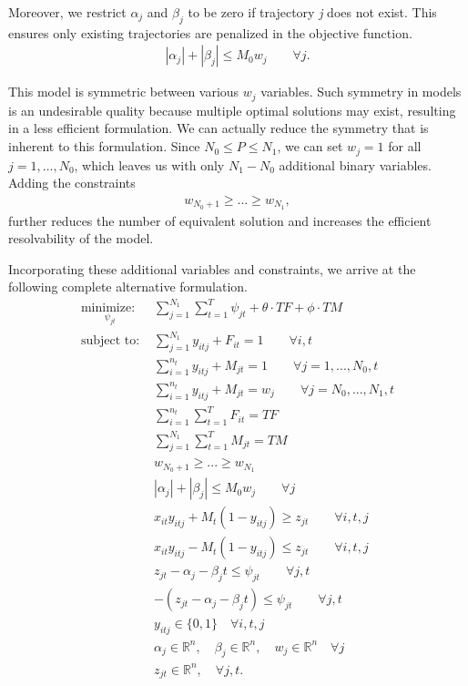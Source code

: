 Moreover, we restrict $\alpha_{j}$ and $\beta_{j}$ to be zero if trajectory \textit{j} does not exist. This ensures only existing trajectories are penalized in the objective function. 
\begin{align*}
|\alpha_{j}|+|\beta_{j}| \leq M_{0}w_{j}\qquad \forall j.
\end{align*}

This model is symmetric between various $w_j$ variables. Such symmetry in models is an undesirable quality because multiple optimal solutions may exist, resulting in a less efficient formulation. We can actually reduce the symmetry that is inherent to this formulation. Since $N_{0} \leq P \leq N_{1}$, we can set $w_j=1$ for all $j=1,\ldots,N_0$, which leaves us with only $N_1-N_0$ additional binary variables. Adding the constraints
\begin{align*}
w_{N_0+1}\geq ...\geq w_{N_1},
\end{align*}
further reduces the number of equivalent solution and increases the efficient resolvability of the model. 

Incorporating these additional variables and constraints, we arrive at the following complete alternative formulation.
\begin{align*}
\underset{\psi_{jt}}{\text{minimize: }} & \sum_{j=1}^{N_{1}} \sum_{t=1}^{T} \psi_{jt} + \theta \cdot TF + \phi \cdot TM\\
\text{subject to: }	& \sum_{j=1}^{N_{1}} y_{itj} + F_{it} = 1 \qquad \forall i,t \nonumber\\
				& \sum_{i=1}^{n_{t}} y_{itj} + M_{jt} = 1 \qquad \forall j=1,...,N_{0},t \nonumber \\
				& \sum_{i=1}^{n_{t}} y_{itj} + M_{jt} = w_{j} \qquad \forall j=N_{0},...,N_{1},t \nonumber \\
				& \sum_{i=1}^{n_{t}} \sum_{t=1}^{T} F_{it} = TF \nonumber \\
				& \sum_{j=1}^{N_{1}} \sum_{t=1}^{T} M_{jt} = TM \nonumber \\
				& w_{N_0+1}\geq ...\geq w_{N_1} \nonumber \\
				& |\alpha_{j}|+|\beta_{j}| \leq M_{0}w_{j}\qquad \forall j \nonumber \\
				& x_{it}y_{itj} + M_{t}(1-y_{itj}) \geq z_{jt} \qquad \forall i,t,j \nonumber \\
				& x_{it}y_{itj} - M_{t}(1-y_{itj}) \leq z_{jt} \qquad \forall i,t,j \nonumber \\
				& z_{jt} - \alpha_{j} - \beta_{j}t \leq \psi_{jt} \qquad \forall j,t \nonumber \\
				& -(z_{jt} - \alpha_{j} - \beta_{j}t) \leq \psi_{jt} \qquad \forall j,t \nonumber \\
			 	& y_{itj} \in \{0,1\} \quad \forall i,t,j \nonumber \\
				& \alpha_{j} \in \mathbb{R}^n,\quad \beta_{j} \in \mathbb{R}^n,\quad w_{j} \in \mathbb{R}^n \quad \forall j \nonumber \\
				& z_{jt} \in \mathbb{R}^n, \quad \forall j,t. \nonumber
\end{align*}


